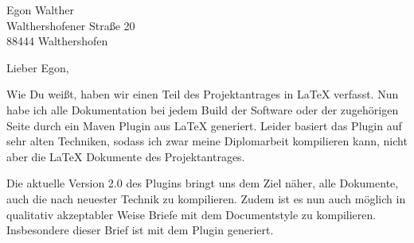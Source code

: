 \documentclass[english,german,a4paper,fontsize=10pt,version=last]{scrlttr2}
\begin{document}
\begin{letter}{Egon Walther \\ Walthershofener Straße 20 \\ 88444 Walthershofen} 
  \opening{Lieber Egon,}

  Wie Du weißt, haben wir einen Teil des Projektantrages in \LaTeX{} verfasst. 
  Nun habe ich alle Dokumentation bei jedem \foreignlanguage{english}{Build} 
  der Software oder der zugehörigen Seite durch ein \foreignlanguage{english}{Maven Plugin} aus \LaTeX{} generiert. 
  Leider basiert das \foreignlanguage{english}{Plugin} auf sehr alten Techniken, 
  sodass ich zwar meine Diplomarbeit kompilieren kann, 
  nicht aber die \LaTeX{} Dokumente des Projektantrages. 

  Die aktuelle Version 2.0 des Plugins bringt uns dem Ziel näher, 
  alle Dokumente, auch die nach neuester Technik zu kompilieren. 
  Zudem ist es nun auch möglich in qualitativ akzeptabler Weise 
  Briefe mit dem \foreignlanguage{english}{Documentstyle} zu kompilieren. 
  Insbesondere dieser Brief ist mit dem Plugin generiert. 
  


  \closing{\Grussworte \\[2\baselineskip]}

\end{letter}

%
\end{document}
